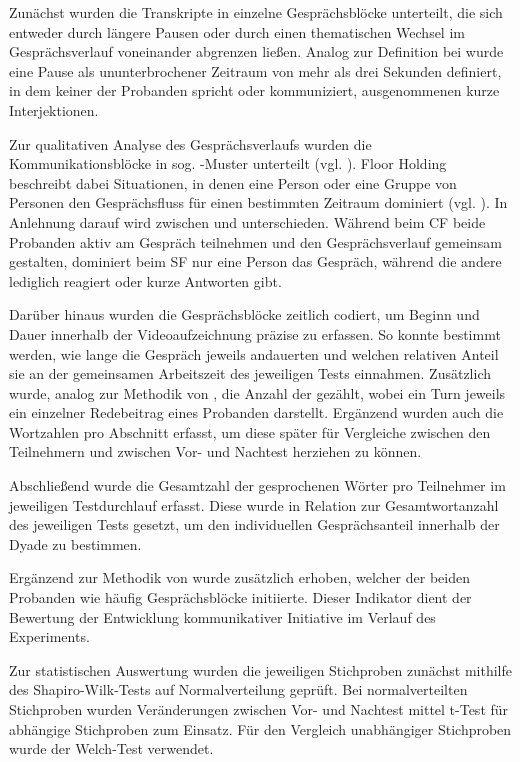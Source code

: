 Zunächst wurden die Transkripte in einzelne Gesprächsblöcke unterteilt, die sich entweder durch längere Pausen oder durch einen thematischen Wechsel im Gesprächsverlauf voneinander abgrenzen ließen. Analog zur Definition bei \citeauthor{nasir_effect_2015} wurde eine Pause als ununterbrochener Zeitraum von mehr als drei Sekunden definiert, in dem keiner der Probanden spricht oder kommuniziert, ausgenommenen kurze Interjektionen.

Zur qualitativen Analyse des Gesprächsverlaufs wurden die Kommunikationsblöcke in sog.  -Muster unterteilt (vgl. \citealp{edelsky_whos_1981}). Floor Holding beschreibt dabei Situationen, in denen eine Person oder eine Gruppe von Personen den Gesprächsfluss für einen bestimmten Zeitraum dominiert (vgl. \citealp[S. 135]{nasir_effect_2015}). In Anlehnung darauf wird zwischen  und   unterschieden. Während beim \ac{CF} beide Probanden aktiv am Gespräch teilnehmen und den Gesprächsverlauf gemeinsam gestalten, dominiert beim \ac{SF} nur eine Person das Gespräch, während die andere lediglich reagiert oder kurze Antworten gibt.

Darüber hinaus wurden die Gesprächsblöcke zeitlich codiert, um Beginn und Dauer innerhalb der Videoaufzeichnung präzise zu erfassen. So konnte bestimmt werden, wie lange die Gespräch jeweils andauerten und welchen relativen Anteil sie an der gemeinsamen Arbeitszeit des jeweiligen Tests einnahmen. Zusätzlich wurde, analog zur Methodik von \citeauthor{nasir_effect_2015}, die Anzahl der  gezählt, wobei ein Turn jeweils ein einzelner Redebeitrag eines Probanden darstellt. Ergänzend wurden auch die Wortzahlen pro Abschnitt erfasst, um diese später für Vergleiche zwischen den Teilnehmern und zwischen Vor- und Nachtest herziehen zu können.

Abschließend wurde die Gesamtzahl der gesprochenen Wörter pro Teilnehmer im jeweiligen Testdurchlauf erfasst. Diese wurde in Relation zur Gesamtwortanzahl des jeweiligen Tests gesetzt, um den individuellen Gesprächsanteil innerhalb der Dyade zu bestimmen.

Ergänzend zur Methodik von \citeauthor{nasir_effect_2015} wurde zusätzlich erhoben, welcher der beiden Probanden wie häufig Gesprächsblöcke initiierte. Dieser Indikator dient der Bewertung der Entwicklung kommunikativer Initiative im Verlauf des Experiments.

Zur statistischen Auswertung wurden die jeweiligen Stichproben zunächst mithilfe des Shapiro-Wilk-Tests auf Normalverteilung geprüft. Bei normalverteilten Stichproben wurden Veränderungen zwischen Vor- und Nachtest mittel t-Test für abhängige Stichproben zum Einsatz. Für den Vergleich unabhängiger Stichproben wurde der Welch-Test verwendet.

